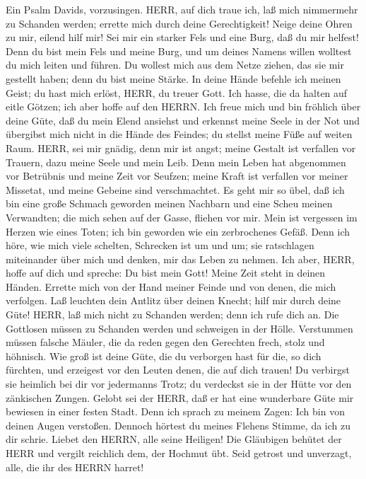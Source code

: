  Ein Psalm Davids, vorzusingen. HERR, auf dich traue ich,
laß mich nimmermehr zu Schanden werden; errette mich durch deine
Gerechtigkeit!  Neige deine Ohren zu mir, eilend hilf mir!
Sei mir ein starker Fels und eine Burg, daß du mir helfest! 
Denn du bist mein Fels und meine Burg, und um deines Namens willen
wolltest du mich leiten und führen.  Du wollest mich aus dem
Netze ziehen, das sie mir gestellt haben; denn du bist meine Stärke.
 In deine Hände befehle ich meinen Geist; du hast mich
erlöst, HERR, du treuer Gott.  Ich hasse, die da halten auf
eitle Götzen; ich aber hoffe auf den HERRN.  Ich freue mich
und bin fröhlich über deine Güte, daß du mein Elend ansiehst und
erkennst meine Seele in der Not  und übergibst mich nicht in
die Hände des Feindes; du stellst meine Füße auf weiten Raum.
 HERR, sei mir gnädig, denn mir ist angst; meine Gestalt ist
verfallen vor Trauern, dazu meine Seele und mein Leib. 
Denn mein Leben hat abgenommen vor Betrübnis und meine Zeit vor Seufzen;
meine Kraft ist verfallen vor meiner Missetat, und meine Gebeine sind
verschmachtet.  Es geht mir so übel, daß ich bin eine große
Schmach geworden meinen Nachbarn und eine Scheu meinen Verwandten; die
mich sehen auf der Gasse, fliehen vor mir.  Mein ist
vergessen im Herzen wie eines Toten; ich bin geworden wie ein
zerbrochenes Gefäß.  Denn ich höre, wie mich viele
schelten, Schrecken ist um und um; sie ratschlagen miteinander über mich
und denken, mir das Leben zu nehmen.  Ich aber, HERR, hoffe
auf dich und spreche: Du bist mein Gott!  Meine Zeit steht
in deinen Händen. Errette mich von der Hand meiner Feinde und von denen,
die mich verfolgen.  Laß leuchten dein Antlitz über deinen
Knecht; hilf mir durch deine Güte!  HERR, laß mich nicht zu
Schanden werden; denn ich rufe dich an. Die Gottlosen müssen zu Schanden
werden und schweigen in der Hölle.  Verstummen müssen
falsche Mäuler, die da reden gegen den Gerechten frech, stolz und
höhnisch.  Wie groß ist deine Güte, die du verborgen hast
für die, so dich fürchten, und erzeigest vor den Leuten denen, die auf
dich trauen!  Du verbirgst sie heimlich bei dir vor
jedermanns Trotz; du verdeckst sie in der Hütte vor den zänkischen
Zungen.  Gelobt sei der HERR, daß er hat eine wunderbare
Güte mir bewiesen in einer festen Stadt.  Denn ich sprach
zu meinem Zagen: Ich bin von deinen Augen verstoßen. Dennoch hörtest du
meines Flehens Stimme, da ich zu dir schrie.  Liebet den
HERRN, alle seine Heiligen! Die Gläubigen behütet der HERR und vergilt
reichlich dem, der Hochmut übt.  Seid getrost und
unverzagt, alle, die ihr des HERRN harret!

